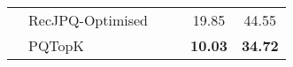 \begin{tabular}{llcccc}
\multicolumn{1}{l|}{}                                                         & \multicolumn{1}{l|}{RecJPQ-Optimised}                                                    &                                                    &                                                             & 19.85                                                   & 44.55                                                 \\
\multicolumn{1}{l|}{}                                                         & \multicolumn{1}{l|}{PQTopK}                                                             &                                                    &                                                             & \textbf{10.03}                                          & \textbf{34.72}                                        \\ \hline
\end{tabular}